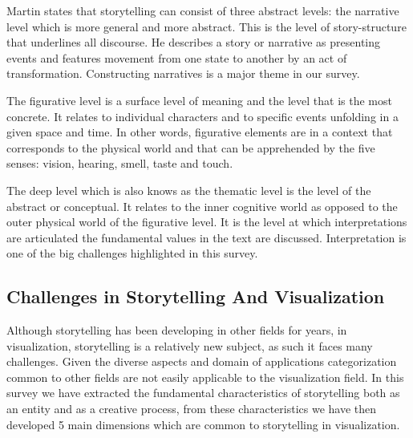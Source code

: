\documentclass{egpubl}
\begin{document}
Martin\cite{Martin1997} states that storytelling can consist of three abstract levels: the narrative level which is more general and more abstract. This is the level of story-structure that underlines all discourse. He describes a story or narrative as presenting events and features movement from one state to another by an act of transformation. Constructing narratives is a major theme in our survey.

The figurative level is a surface level of meaning and the level that is the most concrete. It relates to individual characters and to specific events unfolding in a given space and time. In other words, figurative elements are in a context that corresponds to the physical world and that can be apprehended by the five senses: vision, hearing, smell, taste and touch.

The deep level which is also knows as the thematic level is the level of the abstract or conceptual. It relates to the inner cognitive world as opposed to the outer physical world of the figurative level. It is the level at which interpretations are articulated the fundamental values in the text are discussed. Interpretation is one of the big challenges highlighted in this survey.
\subsection{Challenges in Storytelling And Visualization}
Although storytelling has been developing in other fields for years, in visualization, storytelling is a relatively new subject, as such it faces many challenges.
Given the diverse aspects and domain of applications categorization common to other fields are not easily applicable to the visualization field.
In this survey we have extracted the fundamental characteristics of storytelling both as an entity and as a creative process, from these characteristics we have then developed 5 main dimensions which are common to storytelling in visualization. 

    
\end{document}
